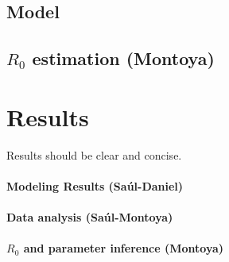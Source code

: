 \documentclass{imammb}
\numberwithin{equation}{section}
\begin{document}
         \subsection*{Model}
             
             
             
         \subsection{$R_0$ estimation (Montoya)}
     \section{Results}
         Results should be clear and concise.
         \paragraph{Modeling Results (Saúl-Daniel)}
         \paragraph{Data analysis (Saúl-Montoya)}
         \paragraph{$R_0$ and parameter inference (Montoya)}


    
\end{document}
